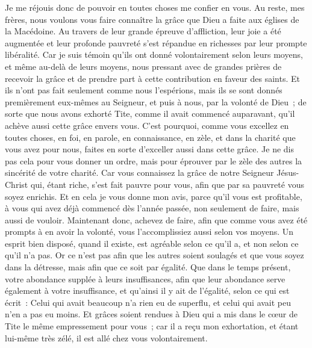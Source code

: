 \begin{multicols}{2}
Je me réjouis donc de pouvoir en toutes choses me confier en vous.
\VerseOne{}Au reste, mes frères, nous voulons vous faire connaître la grâce que Dieu a faite aux églises de la Macédoine.
Au travers de leur grande épreuve d'affliction, leur joie a été augmentée et leur profonde pauvreté s'est répandue en richesses par leur prompte libéralité.
Car je suis témoin qu'ils ont donné volontairement selon leurs moyens, et même au-delà de leurs moyens,
nous pressant avec de grandes prières de recevoir la grâce et de prendre part à cette contribution en faveur des saints.
Et ils n'ont pas fait seulement comme nous l'espérions, mais ils se sont donnés premièrement eux-mêmes au Seigneur, et puis à nous, par la volonté de Dieu~;
de sorte que nous avons exhorté Tite, comme il avait commencé auparavant, qu'il achève aussi cette grâce envers vous.
C'est pourquoi, comme vous excellez en toutes choses, en foi, en parole, en connaissance, en zèle, et dans la charité que vous avez pour nous, faites en sorte d'exceller aussi dans cette grâce.
Je ne dis pas cela pour vous donner un ordre, mais pour éprouver par le zèle des autres la sincérité de votre charité.
Car vous connaissez la grâce de notre Seigneur Jésus-Christ qui, étant riche, s'est fait pauvre pour vous, afin que par sa pauvreté vous soyez enrichis.
Et en cela je vous donne mon avis, parce qu'il vous est profitable, à vous qui avez déjà commencé dès l'année passée, non seulement de faire, mais aussi de vouloir.
Maintenant donc, achevez de faire, afin que comme vous avez été prompts à en avoir la volonté, vous l'accomplissiez aussi selon vos moyens.
Un esprit bien disposé, quand il existe, est agréable selon ce qu'il a, et non selon ce qu'il n'a pas.
Or ce n'est pas afin que les autres soient soulagés et que vous soyez dans la détresse, mais afin que ce soit par égalité. Que dans le temps présent, votre abondance supplée à leurs insuffisances,
afin que leur abondance serve également à votre insuffisance, et qu'ainsi il y ait de l'égalité,
selon ce qui est écrit~: Celui qui avait beaucoup n'a rien eu de superflu, et celui qui avait peu n'en a pas eu moins.
Et grâces soient rendues à Dieu qui a mis dans le cœur de Tite le même empressement pour vous~;
car il a reçu mon exhortation, et étant lui-même très zélé, il est allé chez vous volontairement.

\end{multicols}
